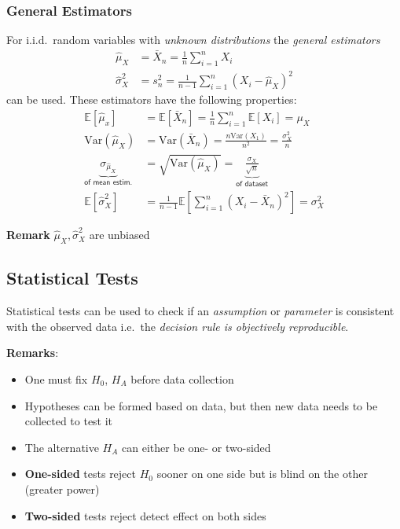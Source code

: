 \subsubsection{General Estimators}
For i.i.d.\ random variables with \textit{unknown distributions} the \textit{general estimators}
\noindent\begin{align*}
    \hat{\mu}_{X}    & =\bar{X}_{n}=\frac1n\sum_{i=1}^{n}X_{i}             \\
    \hat{\sigma}_X^2 & =s_n^2=\frac1{n-1}\sum_{i=1}^n{(X_i-\hat{\mu}_X)}^2
\end{align*}
can be used. These estimators have the following properties:
\noindent\begin{align*}
    \mathbb{E}[\hat{\mu}_x]                                       & =\mathbb{E}[\bar{X}_n]=\frac1n\sum_{i=1}^n\mathbb{E}[X_i]=\mu_X                                    \\
    \mathrm{Var}(\hat{\mu}_X)                                     & =\mathrm{Var}(\bar{X}_n)=\frac{n\mathrm{Var}(X_1)}{n^2}=\frac{\sigma_X^2}n                         \\
    \underbrace{\sigma_{\hat{\mu}_{X}}}_{\textsf{of mean estim.}} & =\sqrt{\mathrm{Var}(\hat{\mu}_{X})}=\underbrace{\frac{\sigma_{X}}{\sqrt{n}}}_{\textsf{of dataset}} \\
    \mathbb{E}[\hat{\sigma}_X^2]                                  & =\frac1{n-1}\mathbb{E}\left[\sum_{i=1}^n{\left(X_i-\bar{X}_n\right)}^2\right] = \sigma^2_X
\end{align*}

\textbf{Remark} $\hat{\mu}_X, \hat{\sigma}_X^2$ are unbiased

\subsection{Statistical Tests}
Statistical tests can be used to check if an \textit{assumption} or \textit{parameter} is consistent with the observed data i.e.\ the \textit{decision rule is objectively reproducible}.

\textbf{Remarks}:
\begin{itemize}
    \item One must fix $H_0$, $H_A$ before data collection
    \item Hypotheses can be formed based on data, but then new data needs to be collected to test it
    \item The alternative $H_A$ can either be one- or two-sided
    \item \textbf{One-sided} tests reject $H_0$ sooner on one side but is blind on the other (greater power)
    \item \textbf{Two-sided} tests reject detect effect on both sides
\end{itemize}

